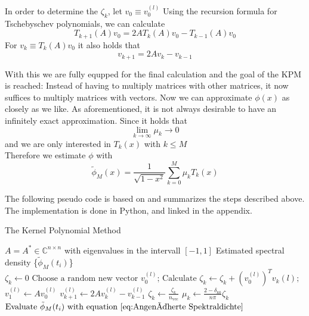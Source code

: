 In order to determine the $\zeta_k$, let $v_0 \equiv v_0^{(l)}$
Using the recursion formula for Tschebyschev polynomials, we can calculate
\[
T_{k + 1}(A)v_0 = 2 A T_k(A) v_0 - T_{k - 1}(A) v_0
\]
For $v_k \equiv T_k(A)v_0$ it also holds that
\[
v_{k + 1} = 2 A v_k - v_{k - 1}
\]

With this we are fully equpped for the final calculation and the goal of the KPM is reached:
Instead of having to multiply matrices with other matrices, it now suffices to multiply matrices with vectors.
Now we can approximate $\phi(x)$ as closely as we like.
As aforementioned, it is not always desirable to have an infinitely exact approximation.
Since it holds that
\[
\lim \limits_{k \to \infty} \mu_k \to 0
\]
and we are only interested in $T_k(x)$ with $k \leq M$\\
Therefore we estimate $\phi$ with
\begin{equation} \label{eq:Angenäherte Spektraldichte}
    \tilde{\phi}_M(x) = \frac{1}{\sqrt{1 - x^2}} \sum_{k = 0}^{M} \mu_k T_k(x)
\end{equation}

The following pseudo code is based on \cite[p.~10]{linsaadyang14} and summarizes the steps described above.
The implementation is done in Python, and linked in the appendix.

\begin{algorithm}
    \caption{The Kernel Polynomial Method}\label{alg:cap}
    \begin{algorithmic}[5]
    \Require $A = A^* \in \mathbb{C}^{n \times n}$ with eigenvalues in the intervall $[-1, 1]$
    \Ensure Estimated spectral density \{$\tilde{\phi}_M(t_i)$\}\\
    \State $\zeta_k \gets 0$
    \EndFor
    \State $\text{Choose a random new vector } v_0^{(l)}\text{;}$ 
    \State $\text{Calculate } \zeta_k \gets \zeta_k + \left( v_0^{(l)} \right)^T v_k{(l)}\text{;}$  
    \State $v_1^{(l)} \gets A v_0^{(l)}$
    \Else
    \State $v_{k+1}^{(l)} \gets 2 A v_k^{(l)} - v_{k-1}^{(l)}$ 
    \EndIf
    \EndFor
    \EndFor
    \State $\zeta_k \gets \frac{\zeta_k}{n_{\text{vec}}}$
    \State $\mu_k \gets \frac{2 - \delta_{k0}}{n \pi} \zeta_k$
    \EndFor
    \State $\text{Evaluate } \tilde{\phi}_M(t_i) \text{ with equation } \ref{eq:Angenäherte Spektraldichte}$
    \end{algorithmic}
\end{algorithm}

